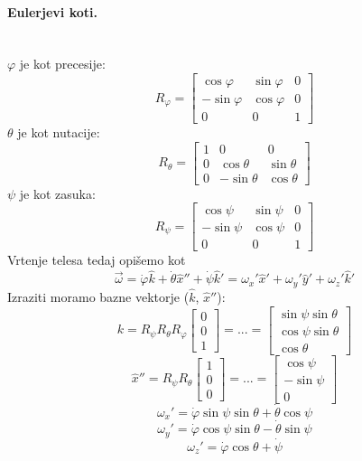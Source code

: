 \documentclass[a4paper]{article}
\newcommand{\vct}[1]{\overrightarrow{#1}}
\begin{document}
\paragraph{Eulerjevi koti.} \text{} \\
$\varphi$ je kot precesije:
$$R_{\varphi} = \begin{bmatrix}
    \cos\varphi & \sin\varphi & 0 \\
    -\sin\varphi & \cos\varphi & 0 \\
    0 & 0 & 1
\end{bmatrix}$$
$\theta$ je kot nutacije:
$$R_\theta = \begin{bmatrix}
    1 & 0 & 0 \\
    0 & \cos\theta & \sin\theta \\
    0 & -\sin\theta & \cos\theta
\end{bmatrix}$$
$\psi$ je kot zasuka:
$$R_\psi = \begin{bmatrix}
    \cos\psi & \sin\psi & 0 \\
    -\sin\psi & \cos\psi & 0 \\
    0 & 0 & 1
\end{bmatrix}$$
Vrtenje telesa tedaj opišemo kot
$$\vct{\omega} = \dot\varphi \widehat{k} + \dot\theta \widehat{x}'' + \dot\psi \widehat{k}' = \omega_x'\widehat{x}' + \omega_y'\widehat{y}' + \omega_z'\widehat{k}'$$
Izraziti moramo bazne vektorje ($\widehat{k}$, $\widehat{x}''$):
$$k = R_\psi R_\theta R_\varphi\begin{bmatrix}
    0 \\ 0 \\ 1
\end{bmatrix} = ... = \begin{bmatrix}
    \sin\psi\sin\theta \\
    \cos\psi\sin\theta \\
    \cos\theta
\end{bmatrix}$$
$$\widehat{x}'' = R_\psi R_\theta \begin{bmatrix}
    1 \\ 0 \\ 0
\end{bmatrix} = ... = \begin{bmatrix}
    \cos\psi \\ -\sin\psi \\ 0
\end{bmatrix}$$
$$\omega_x' = \dot\varphi\sin\psi\sin\theta + \dot\theta\cos\psi$$
$$\omega_y' = \dot\varphi\cos\psi\sin\theta - \dot\theta\sin\psi$$
$$\omega_z' = \dot\varphi\cos\theta + \dot\psi$$
\end{document}
